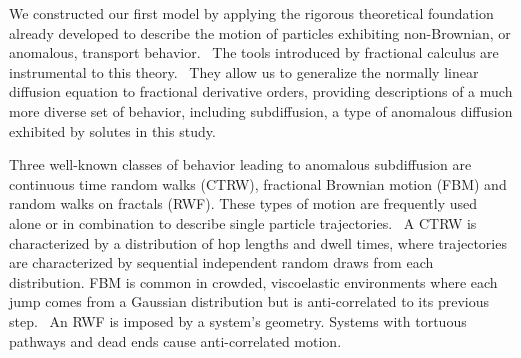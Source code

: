 \documentclass[aps,pre,preprint,groupedaddress]{revtex4-2}
\begin{document}
%  
  
  We constructed our first model by applying the rigorous theoretical foundation 
  already developed to describe the motion of particles exhibiting non-Brownian, or
  anomalous, transport behavior.~\cite{metzler_random_2000,bouchaud_anomalous_1990}
  The tools introduced by fractional calculus are instrumental to this theory.~\cite{gorenflo_fractional_1997}
  They allow us to generalize the normally linear diffusion equation to fractional
  derivative orders, providing descriptions of a much more diverse set of behavior,
  including subdiffusion, a type of anomalous diffusion exhibited by solutes in 
  this study.~\cite{klages_anomalous_2008}

  Three well-known classes of behavior leading to anomalous subdiffusion are 
  continuous time random walks (CTRW), fractional Brownian motion
  (FBM) and random walks on fractals (RWF).\cite{meroz_toolbox_2015}
  These types of motion are frequently used alone or in combination to describe
  single particle trajectories.~\cite{morrin_three_2018,metzler_anomalous_2014}
  A CTRW is characterized by a distribution of hop lengths and dwell times, 
  where trajectories are characterized by sequential independent random draws from 
  each distribution.\cite{montroll_random_1965} FBM is common in crowded,
  viscoelastic environments where each jump comes from a Gaussian distribution
  but is anti-correlated to its previous step.~\cite{mandelbrot_fractional_1968,jeon_fractional_2010,banks_anomalous_2005}
  An RWF is imposed by a system's geometry. Systems with tortuous pathways 
  and dead ends cause anti-correlated motion.\cite{meroz_toolbox_2015,neusius_subdiffusion_2008}
\end{document}
